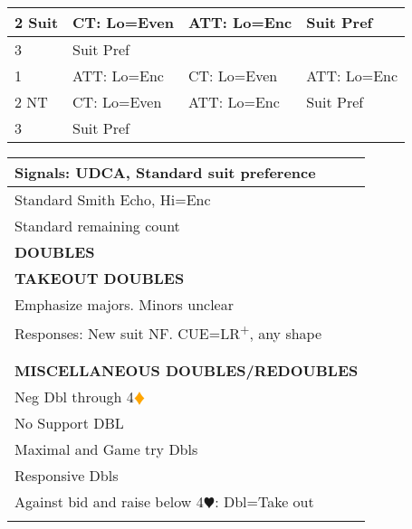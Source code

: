 \documentclass{article}
\newcommand{\he}{\textcolor{RubineRed}{$\varheart$}}
\newcommand{\di}{\textcolor{Orange}{$\vardiamond$}}
\newcommand{\up}{\textsuperscript{+}}
\begin{document}
\begin{minipage}{90mm}
\begin{tabular}{| p{8.9mm} | p{22mm} | p{22mm} | p{22mm} |}
		2 Suit & CT: Lo=Even & ATT: Lo=Enc & Suit Pref \\ \hline
		3 & Suit Pref & & \\ \hline
		1 & ATT: Lo=Enc & CT: Lo=Even & ATT: Lo=Enc \\ \hline
		2 NT & CT: Lo=Even & ATT: Lo=Enc & Suit Pref \\ \hline
		3 & Suit Pref & & \\ \hline
	\end{tabular}
	\begin{tabular}{| p{88mm} |}
		Signals: UDCA, Standard suit preference \\ \hline
		Standard Smith Echo, Hi=Enc \\ \hline
		Standard remaining count \\ \hline
		\cellcolor[gray]{0.9} \textbf{DOUBLES} \\ \hline
		\cellcolor[gray]{0.9} \textbf{TAKEOUT DOUBLES} \\ \hline
		Emphasize majors. Minors unclear \\ \hline
		Responses: New suit NF. CUE=LR\up{}, any shape \\ \hline
		\\ \hline
		\\ \hline
		\cellcolor[gray]{0.9} \textbf{MISCELLANEOUS DOUBLES/REDOUBLES} \\ \hline
		Neg Dbl through 4\di{} \\ \hline
		No Support DBL \\ \hline
		Maximal and Game try Dbls \\ \hline
		Responsive Dbls \\ \hline
		Against bid and raise below 4\he{}: Dbl=Take out\\ \hline
		\\ \hline
	\end{tabular}
\end{minipage}
\begin{minipage}{5mm}
	\begin{tabular}{| p{5mm} |}
	\end{tabular}
\end{minipage}
\end{document}
